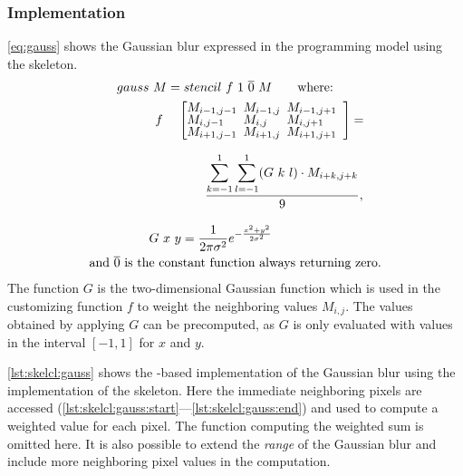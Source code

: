 \subsubsection*{\SkelCL Implementation}
\autoref{eq:gauss} shows the Gaussian blur expressed in the \SkelCL programming model using the \stencil skeleton.
\begin{align}
  gauss&\ M = stencil\ f\ 1\ \overline{0}\ M \qquad\text{where:}\nonumber\\
  &
  \begin{array}{ll}%
  f\ &\left[\begin{array}{lll}%
      \hspace{-.5em} M_{i-1,j-1}& \hspace{-.5em} M_{i-1,j} & \hspace{-.5em}M_{i-1,j+1}\vspace{-.25em}\\%
      \hspace{-.5em} M_{i,j-1}& \hspace{-.5em} M_{i,j} & \hspace{-.5em}M_{i,j+1}\vspace{-.25em}\\%
      \hspace{-.5em} M_{i+1,j-1}& \hspace{-.5em} M_{i+1,j} & \hspace{-.5em}M_{i+1,j+1}
    \end{array}\right]  = \\[2em]
          &\qquad \displaystyle\frac{\displaystyle\sum_{k=-1}^{1} \sum_{l=-1}^{1} (G\ k\ l)\cdot M_{i+k, j+k}}{9},
  \end{array} \label{eq:gauss}\\[1em]
  &G\ x\ y = \frac{1}{2\pi \sigma^{2}} e^{-\frac{x^2 + y^2}{2\sigma^2}} \nonumber\\
  \text{and } \overline{0} \text{ is th}&\text{e constant function always returning zero.}\nonumber
\end{align}
The function $G$ is the two-dimensional Gaussian function which is used in the customizing function $f$ to weight the neighboring values $M_{i,j}$.
The values obtained by applying $G$ can be precomputed, as $G$ is only evaluated with values in the interval $[-1, 1]$ for $x$ and $y$.


\autoref{lst:skelcl:gauss} shows the \SkelCL-based implementation of the Gaussian blur using the  implementation of the \stencil skeleton.
Here the immediate neighboring pixels are accessed (\autoref{lst:skelcl:gauss:start}---\autoref{lst:skelcl:gauss:end}) and used to compute a weighted value for each pixel.
The function computing the weighted sum is omitted here.
It is also possible to extend the \emph{range} of the Gaussian blur and include more neighboring pixel values in the computation.

